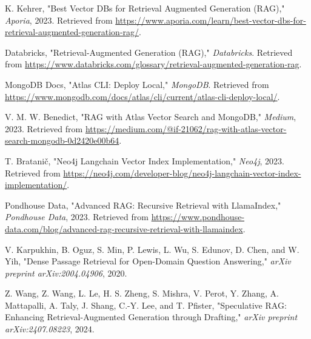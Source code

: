 \documentclass{wseas}
\begin{document}
\begin{thebibliography}{9}
   K. Kehrer, "Best Vector DBs for Retrieval Augmented Generation (RAG)," \textit{Aporia}, 2023. Retrieved from \url{https://www.aporia.com/learn/best-vector-dbs-for-retrieval-augmented-generation-rag/}.
  
   Databricks, "Retrieval-Augmented Generation (RAG)," \textit{Databricks}. Retrieved from \url{https://www.databricks.com/glossary/retrieval-augmented-generation-rag}.
  
   MongoDB Docs, "Atlas CLI: Deploy Local," \textit{MongoDB}. Retrieved from \url{https://www.mongodb.com/docs/atlas/cli/current/atlas-cli-deploy-local/}.
  
   V. M. W. Benedict, "RAG with Atlas Vector Search and MongoDB," \textit{Medium}, 2023. Retrieved from \url{https://medium.com/@if-21062/rag-with-atlas-vector-search-mongodb-0d2420e00b64}.
  
   T. Bratanič, "Neo4j Langchain Vector Index Implementation," \textit{Neo4j}, 2023. Retrieved from \url{https://neo4j.com/developer-blog/neo4j-langchain-vector-index-implementation/}.
  
   Pondhouse Data, "Advanced RAG: Recursive Retrieval with LlamaIndex," \textit{Pondhouse Data}, 2023. Retrieved from \url{https://www.pondhouse-data.com/blog/advanced-rag-recursive-retrieval-with-llamaindex}.
  
   V. Karpukhin, B. Oguz, S. Min, P. Lewis, L. Wu, S. Edunov, D. Chen, and W. Yih, "Dense Passage Retrieval for Open-Domain Question Answering," \textit{arXiv preprint arXiv:2004.04906}, 2020.
  
   Z. Wang, Z. Wang, L. Le, H. S. Zheng, S. Mishra, V. Perot, Y. Zhang, A. Mattapalli, A. Taly, J. Shang, C.-Y. Lee, and T. Pfister, "Speculative RAG: Enhancing Retrieval-Augmented Generation through Drafting," \textit{arXiv preprint arXiv:2407.08223}, 2024.
  
  \end{thebibliography}
  
\end{document}
